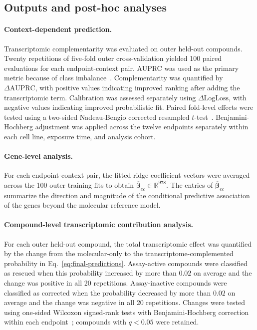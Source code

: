\documentclass[11pt,a4paper]{article}
\begin{document}
\subsection{Outputs and post-hoc analyses}

\paragraph{Context-dependent prediction.}

Transcriptomic complementarity was evaluated on outer held-out compounds.
Twenty repetitions of five-fold outer cross-validation yielded 100 paired
evaluations for each endpoint-context pair. AUPRC was used as the
primary metric because of class imbalance~\cite{saito2015precision}.
Complementarity was quantified by \(\Delta\mathrm{AUPRC}\), with positive
values indicating improved ranking after adding the transcriptomic term.
Calibration was assessed separately using
\(\Delta\mathrm{LogLoss}\), with negative values indicating improved probabilistic fit. Paired fold-level effects were
tested using a two-sided Nadeau-Bengio corrected resampled \(t\)-test~\cite{nadeau2003inference}. Benjamini-Hochberg adjustment was applied across
the twelve endpoints separately within each cell line, exposure time, and
analysis cohort.

\paragraph{Gene-level analysis.}

For each endpoint-context pair, the fitted ridge coefficient vectors were
averaged across the 100 outer training fits to obtain
\(\overline{\boldsymbol\beta}_{ec}\in\mathbb R^{978}\). The entries of
\(\overline{\boldsymbol\beta}_{ec}\) summarize the direction and magnitude
of the conditional predictive association of the genes beyond
the molecular reference model.

\paragraph{Compound-level transcriptomic contribution analysis.}

For each outer held-out compound, the total transcriptomic effect was
quantified by the change from the molecular-only to the
transcriptome-complemented probability in
Eq.~\eqref{eq:final-predictions}. Assay-active compounds were classified as rescued
when this probability increased by more than \(0.02\) on average and the
change was positive in all 20 repetitions. Assay-inactive compounds were
classified as corrected when the probability decreased by more than \(0.02\)
on average and the change was negative in all 20 repetitions. Changes were
tested using one-sided Wilcoxon signed-rank tests with Benjamini-Hochberg
correction within each endpoint~\cite{benjamini1995fdr};
compounds with \(q<0.05\) were retained.
\end{document}

